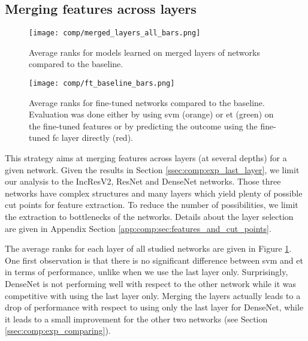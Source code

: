 \subsection{Merging features across layers}
\label{ssec:comp:exp_merged_layers}

\begin{figure}
    \centering
    \texttt{[image: comp/merged\_layers\_all\_bars.png]}
    \caption{Average ranks for models learned on merged layers of networks compared to the baseline.}
    \label{fig:comp:res_avg_ranks_merged_layers}
\end{figure}

 
\begin{figure}
    \centering
    \texttt{[image: comp/ft\_baseline\_bars.png]}
    \caption{Average ranks for fine-tuned networks compared to the baseline. Evaluation was done either by using \acrshort{svm} (orange) or \acrlong{et} (green) on the fine-tuned features or by predicting the outcome using the fine-tuned \acrlong{fc} layer directly (red).}
    \label{fig:comp:res_avg_ranks_ft}
\end{figure}

This strategy aims at merging features across layers (at several depths) for a given network. Given the results in Section \ref{ssec:comp:exp_last_layer}, we limit our analysis to the IncResV2, ResNet and DenseNet networks. Those three networks have complex structures and many layers which yield plenty of possible cut points for feature extraction. To reduce the number of possibilities, we limit the extraction to bottlenecks of the networks. Details about the layer selection are given in Appendix Section \ref{app:comp:sec:features_and_cut_points}. 

The average ranks for each layer of all studied networks are given in Figure \ref{fig:comp:res_avg_ranks_merged_layers}. One first observation is that there is no significant difference between \acrshort{svm} and \acrshort{et} in terms of performance, unlike when we use the last layer only. Surprisingly, DenseNet is not performing well with respect to the other network while it was competitive with using the last layer only. Merging the layers actually leads to a drop of performance with respect to using only the last layer for DenseNet, while it leads to a small improvement for the other two networks (see Section \ref{ssec:comp:exp_comparing}).

